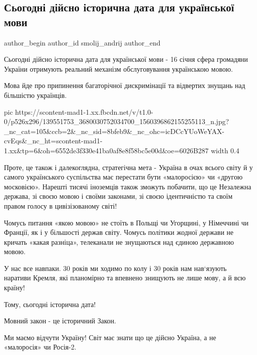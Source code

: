  
 
 
 
 
\subsection{Сьогодні дійсно історична дата для української мови}
\ifcmt
  author_begin
   author_id smolij_andrij
  author_end
\fi

Сьогодні дійсно історична дата для української мови - 16 січня сфера громадяни
України отримують реальний механізм обслуговування українською мовою. 

Мова йде про припинення багаторічної дискримінації та відвертих знущань над
більшістю українців.


\ifcmt
  pic https://scontent-mad1-1.xx.fbcdn.net/v/t1.0-0/p526x296/139551753_3680030752034700_1560396862155255113_n.jpg?_nc_cat=105&ccb=2&_nc_sid=8bfeb9&_nc_ohc=icDCcYUoWeYAX-cvEqs&_nc_ht=scontent-mad1-1.xx&tp=6&oh=6552de3f330e41ba0af8e8f58bc5e00d&oe=6026B287
  width 0.4
\fi


Проте, це також і далекоглядна, стратегічна мета - Україна в очах всього світу
й у самого українського суспільства має перестати бути «малоросією» чи «другою
московією». Нарешті тисячі іноземців також зможуть побачити, що це Незалежна
держава, зі своєю мовою і своїми законами, зі своєю ідентичністю та своїм
правом голосу в цивізізованому світі! 

Чомусь питання «якою мовою» не стоїть в Польщі чи Угорщині, у Німеччині чи
Франції, як і у більшості держав світу. Чомусь політики жодної держави не
кричать «какая разніца», телеканали не знущаються над єдиною державною мовою. 

У нас все навпаки. 30 років ми ходимо по колу і 30 років нам нав‘язують
наративи Кремля, які планомірно та впевнено знищують не лише мову, а й всю
країну! 

Тому, сьогодні історична дата! 

Мовний закон - це історичний Закон. 

Ми маємо відчути Україну! Світ має знати що це дійсно Україна, а не «малоросія»
чи Росія-2.

